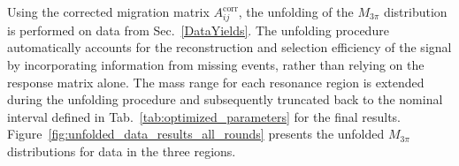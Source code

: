 

Using the corrected migration matrix $A_{ij}^{\text{corr}}$, the unfolding of the $M_{3\pi}$ distribution is performed on data from Sec.~\ref{DataYields}. The unfolding procedure automatically accounts for the reconstruction and selection efficiency of the signal by incorporating information from missing events, rather than relying on the response matrix alone. The mass range for each resonance region is extended during the unfolding procedure and subsequently truncated back to the nominal interval defined in Tab.~\ref{tab:optimized_parameters} for the final results. Figure~\ref{fig:unfolded_data_results_all_rounds} presents the unfolded $M_{3\pi}$ distributions for data in the three regions.

